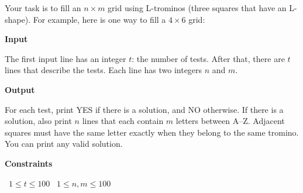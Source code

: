 Your task is to fill an $n \times m$ grid using L-trominos (three squares that have an L-shape). For example, here is one way to fill a $4 \times 6$ grid:

\vspace{0.3cm}\noindent\textbf{Input}

The first input line has an integer $t$: the number of tests.
After that, there are $t$ lines that describe the tests. Each line has two integers $n$ and $m$.

\vspace{0.3cm}\noindent\textbf{Output}

For each test, print YES if there is a solution, and NO otherwise.
If there is a solution, also print $n$ lines that each contain $m$ letters between A–Z. Adjacent squares must have the same letter exactly when they belong to the same tromino. You can print any valid solution.

\vspace{0.3cm}\noindent\textbf{Constraints}

\textbullet\ $1 \le t \le 100$
\textbullet\ $1 \le n,m \le 100$